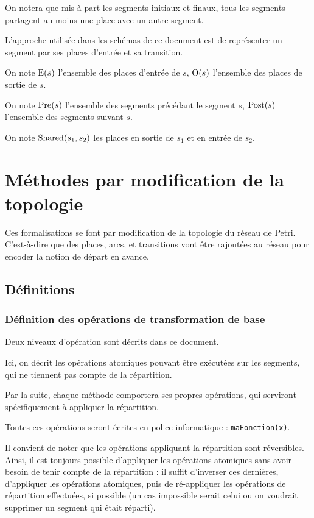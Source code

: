 On notera que mis à part les segments initiaux et finaux, tous les segments partagent au moins une place avec un autre segment.

L'approche utilisée dans les schémas de ce document est de représenter un segment par ses places d'entrée et sa transition.

\begin{mynot}
On note $\operatorname{E}(s)$ l'ensemble des places d'entrée de $s$, $\operatorname{O}(s)$ l'ensemble des places de sortie de $s$.
\end{mynot}

\begin{mynot}
On note $\operatorname{Pre}(s)$ l'ensemble des segments précédant le segment $s$, $\operatorname{Post}(s)$ l'ensemble des segments suivant $s$.
\end{mynot}

\begin{mynot}
On note $\operatorname{Shared}(s_1, s_2)$ les places en sortie de $s_1$ et en entrée de $s_2$.
\end{mynot}

\section{Méthodes par modification de la topologie}
Ces formalisations se font par modification de la topologie du réseau de Petri. C'est-à-dire que des places, arcs, et transitions vont être rajoutées au réseau pour encoder la notion de départ en avance.

\subsection{Définitions}
\subsubsection{Définition des opérations de transformation de base}
Deux niveaux d'opération sont décrits dans ce document.

Ici, on décrit les opérations atomiques pouvant être exécutées sur les segments, qui ne tiennent pas compte de la répartition. 

Par la suite, chaque méthode comportera ses propres opérations, qui serviront spécifiquement à appliquer la répartition. 

Toutes ces opérations seront écrites en police informatique : \texttt{maFonction(x)}.

Il convient de noter que les opérations appliquant la répartition sont réversibles. Ainsi, il est toujours possible d'appliquer les opérations atomiques sans avoir besoin de tenir compte de la répartition : il suffit d'inverser ces dernières, d'appliquer les opérations atomiques, puis de ré-appliquer les opérations de répartition effectuées, si possible (un cas impossible serait celui ou on voudrait supprimer un segment qui était réparti).

